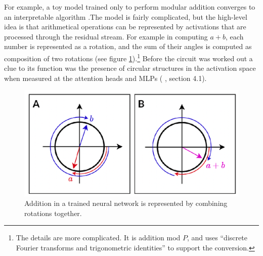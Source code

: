 For example, a toy model trained only to perform modular addition converges to an interpretable algorithm \cite{nanda2023progress}.The model is fairly complicated, but the high-level idea is that arithmetical operations can be represented by activations that are processed through the residual stream. For example in computing $a + b$, each number is represented as a rotation, and the sum of their angles is computed as composition of two rotations (see figure \ref{toyModelAddition}).\footnote{The details are more complicated. It is addition mod $P$, and uses ``discrete Fourier transforms and trigonometric identities'' \cite{nanda2023progress} to support the conversion.} Before the circuit was worked out a clue to its function was the presence of circular structures in the activation space when measured at the attention heads and MLPs (\cite{nanda2023progress} , section 4.1).

\begin{figure}[h]
\centering
\includegraphics[scale=.4]{./images/toyModelAddition.png}
\caption[From \cite{nanda2023progress} .]{Addition in a trained neural network is represented by combining rotations together.}
\label{toyModelAddition}
\end{figure}



